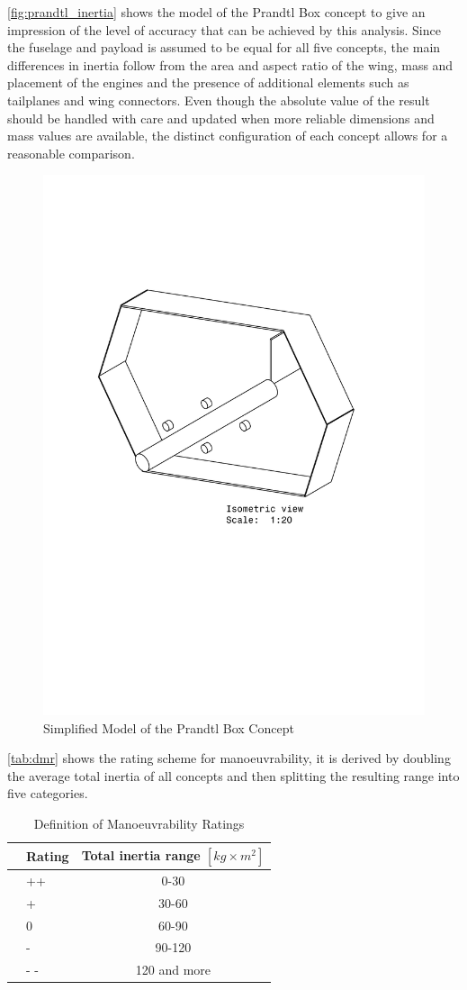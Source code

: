 \autoref{fig:prandtl_inertia} shows the model of the Prandtl Box concept to give an impression of the level of accuracy that can be achieved by this analysis. Since the fuselage and payload is assumed to be equal for all five concepts, the main differences in inertia follow from the area and aspect ratio of the wing, mass and placement of the engines and the presence of additional elements such as tailplanes and wing connectors. Even though the absolute value of the result should be handled with care and updated when more reliable dimensions and mass values are available, the distinct configuration of each concept allows for a reasonable comparison. 

\begin{figure}[htb]
    \centering
    \includegraphics[width=.4\textwidth]{Stability/Figures/prandtl.pdf}
    \caption{Simplified Model of the Prandtl Box Concept}
    \label{fig:prandtl_inertia}
\end{figure}

\autoref{tab:dmr} shows the rating scheme for manoeuvrability, it is derived by doubling the average total inertia of all concepts and then splitting the resulting range into five categories.  

\begin{table}[H]
\centering
\caption{Definition of Manoeuvrability Ratings}
\label{tab:dmr}
    \begin{tabular}{llc}
        \toprule
            &\textbf{Rating}           & \textbf{Total inertia range $[kg \times m^2]$}
        \\ \midrule
          & ++            &  0-30       
        \\ \hdashline
          & +               & 30-60
        \\ \hdashline
          & 0          & 60-90
        \\ \hdashline
          & -           & 90-120
        \\ \hdashline
          & - -    & 120 and more
        \\ \bottomrule
    \end{tabular}
\end{table}

